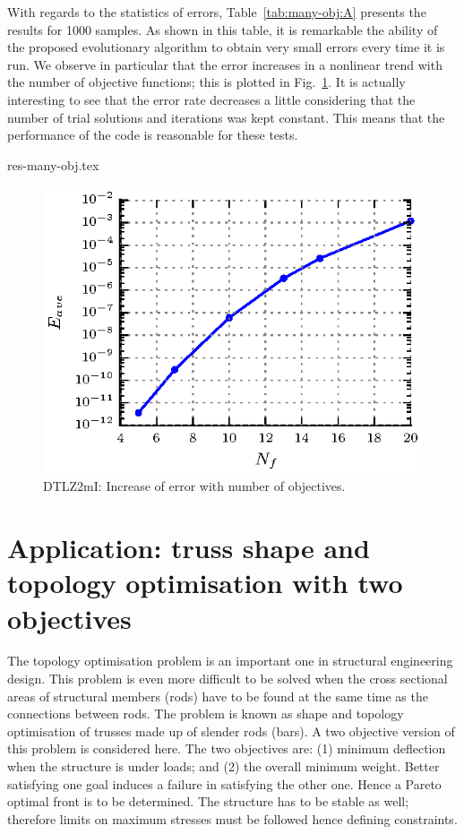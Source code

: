 \documentclass[final,5p,times,twocolumn]{elsarticle}
\newcommand{\figname} {Fig.}
\begin{document}
With regards to the statistics of errors, Table~\ref{tab:many-obj:A} presents the results for 1000
samples. As shown in this table, it is remarkable the ability of the proposed evolutionary algorithm
to obtain very small errors every time it is run. We observe in particular that the error increases
in a nonlinear trend with the number of objective functions; this is plotted in
\figname~\ref{fig:multierror}. It is actually interesting to see that the error rate decreases a
little considering that the number of trial solutions and iterations was kept constant. This means
that the performance of the code is reasonable for these tests.

{res-many-obj.tex}

\begin{figure} \centering
\includegraphics[scale=1]{./figs/res/multierror.eps}
\caption{DTLZ2mI: Increase of error with number of objectives.}
\label{fig:multierror}
\end{figure}



\section{Application: truss shape and topology optimisation with two objectives}
\label{sec:topology}

The topology optimisation problem is an important one in structural engineering design. This problem
is even more difficult to be solved when the cross sectional areas of structural members (rods) have
to be found at the same time as the connections between rods. The problem is known as shape and
topology optimisation of trusses made up of slender rods (bars). A two objective version of this
problem is considered here. The two objectives are: (1) minimum deflection when the structure is
under loads; and (2) the overall minimum weight. Better satisfying one goal induces a failure in
satisfying the other one. Hence a Pareto optimal front is to be determined. The structure has to be
stable as well; therefore limits on maximum stresses must be followed hence defining constraints.
\end{document}
